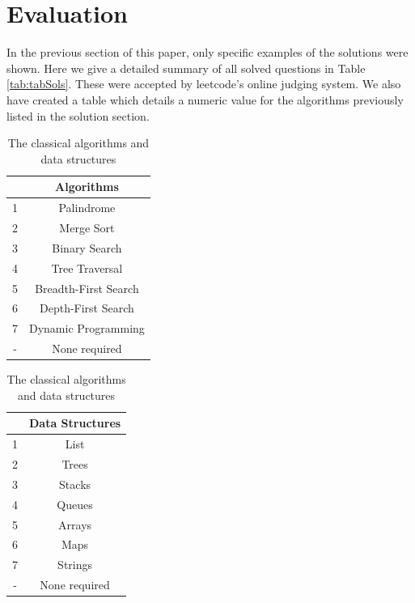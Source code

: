 \documentclass[10pt,twocolumn,hidelinks]{IEEEtran}
\begin{document}
\section{Evaluation}
In the previous section of this paper, only specific examples of the solutions were shown. Here we give a detailed summary of all solved questions in Table \ref{tab:tabSols}. These were accepted by leetcode's online judging system. 
We also have created a table which details a numeric value for the algorithms previously listed in the solution section.
\begin{table}
\parbox{.45\linewidth}{
\centering
\begin{tabular}{|c|c|}
		    &Algorithms \\ \hline
		1 & Palindrome\\ \hline
		2 & Merge Sort\\ \hline
		3 & Binary Search\\ \hline
		4 & Tree Traversal \\ \hline
		5 & Breadth-First Search\\ \hline
		6 & Depth-First Search\\ \hline
		7 & Dynamic Programming\\ \hline
		- & None required\\ \hline
\end{tabular}
\caption{The classical algorithms and data structures}
\label{tab:classicalAlgos}
}
\hfill
\parbox{.45\linewidth}{
\centering
\begin{tabular}{|c|c|}
	&Data Structures \\ \hline
	1 & List\\ \hline
	2 & Trees\\ \hline
	3 & Stacks\\ \hline
	4 & Queues \\ \hline
	5 & Arrays\\ \hline
	6 & Maps\\ \hline	
	7&Strings\\ \hline
	-&None required\\
\end{tabular}
}
\end{table}
\end{document}
